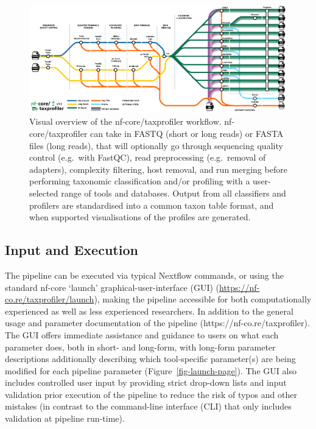 \documentclass[
]{article}
\begin{document}
\begin{figure}

{\centering \includegraphics{taxprofiler_tube.png}

}

\caption{\label{fig-workflow-diagram}Visual overview of the
nf-core/taxprofiler workflow. nf-core/taxprofiler can take in FASTQ
(short or long reads) or FASTA files (long reads), that will optionally
go through sequencing quality control (e.g.~with FastQC), read
preprocessing (e.g.~removal of adapters), complexity filtering, host
removal, and run merging before performing taxonomic classification
and/or profiling with a user-selected range of tools and databases.
Output from all classifiers and profilers are standardised into a common
taxon table format, and when supported visualisations of the profiles
are generated.}

\end{figure}

\hypertarget{input-and-execution}{%
\subsection{Input and Execution}\label{input-and-execution}}

The pipeline can be executed via typical Nextflow commands, or using the
standard nf-core `launch' graphical-user-interface (GUI)
(\url{https://nf-co.re/taxprofiler/launch}), making the pipeline
accessible for both computationally experienced as well as less
experienced researchers. In addition to the general usage and parameter
documentation of the pipeline (https://nf-co.re/taxprofiler). The GUI
offers immediate assistance and guidance to users on what each parameter
does, both in short- and long-form, with long-form parameter
descriptions additionally describing which tool-specific parameter(s)
are being modified for each pipeline parameter
(Figure~\ref{fig-launch-page}). The GUI also includes controlled user
input by providing strict drop-down lists and input validation prior
execution of the pipeline to reduce the risk of typos and other mistakes
(in contrast to the command-line interface (CLI) that only includes
validation at pipeline run-time).
\end{document}
